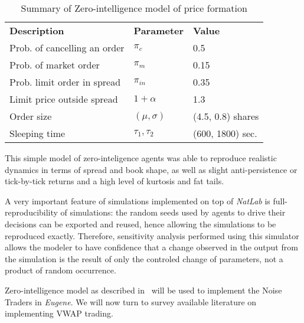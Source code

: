 \begin{table}[htbp]
\begin{center}
\begin{tabular}{ l l l }
\textbf{Description} & \textbf{Parameter} & \textbf{Value} \\
\cmidrule(r){1-3}
Prob. of cancelling an order & $\pi_c$    		& 0.5                \\
Prob. of market order		 & $\pi_m$   		& 0.15               \\
Prob. limit order in spread  & $\pi_{in}$ 		& 0.35               \\ 
Limit price outside spread   & $1+\alpha$ 		& 1.3                \\
Order size					 & $(\mu, \sigma)$	& (4.5, 0.8) shares  \\
Sleeping time				 & $\tau_1, \tau_2$ & (600, 1800) sec.   \\
\end{tabular}
\end{center}
\caption{Summary of Zero-intelligence model of price formation}
\label{Table/Zero-Intelligence}
\end{table}

This simple model of zero-inteligence agents was able to reproduce realistic dynamics in terms of spread and book shape, as well as slight anti-persistence or tick-by-tick returns and a high level of kurtosis and fat tails. 

A very important feature of simulations implemented on top of \textit{NatLab} is full-reproducibility of simulations: the random seeds used by agents to drive their decisions can be exported and reused, hence allowing the simulations to be reproduced exactly. Therefore, sensitivity analysis performed using this simulator allows the modeler to have confidence that a change observed in the output from the simulation is the result of only the controled change of parameters, not a product of random occurrence.

Zero-intelligence model as described in~\citet[chap.~4]{Gilles2006} will be used to implement the Noise Traders in \textit{Eugene}. We will now turn to survey available literature on implementing VWAP trading.  







   







